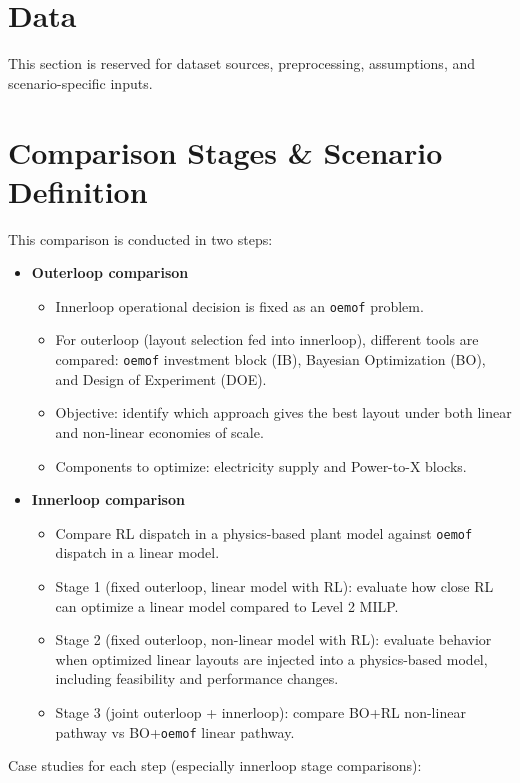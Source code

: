 \section{Data}

This section is reserved for dataset sources, preprocessing, assumptions, and scenario-specific inputs.

\section{Comparison Stages \& Scenario Definition}

This comparison is conducted in two steps:

\begin{itemize}
\item \textbf{Outerloop comparison}
\begin{itemize}
\item Innerloop operational decision is fixed as an \texttt{oemof} problem.
\item For outerloop (layout selection fed into innerloop), different tools are compared: \texttt{oemof} investment block (IB), Bayesian Optimization (BO), and Design of Experiment (DOE).
\item Objective: identify which approach gives the best layout under both linear and non-linear economies of scale.
\item Components to optimize: electricity supply and Power-to-X blocks.
\end{itemize}

\item \textbf{Innerloop comparison}
\begin{itemize}
\item Compare RL dispatch in a physics-based plant model against \texttt{oemof} dispatch in a linear model.
\item Stage 1 (fixed outerloop, linear model with RL): evaluate how close RL can optimize a linear model compared to Level 2 MILP.
\item Stage 2 (fixed outerloop, non-linear model with RL): evaluate behavior when optimized linear layouts are injected into a physics-based model, including feasibility and performance changes.
\item Stage 3 (joint outerloop + innerloop): compare BO+RL non-linear pathway vs BO+\texttt{oemof} linear pathway.
\end{itemize}
\end{itemize}

Case studies for each step (especially innerloop stage comparisons):

